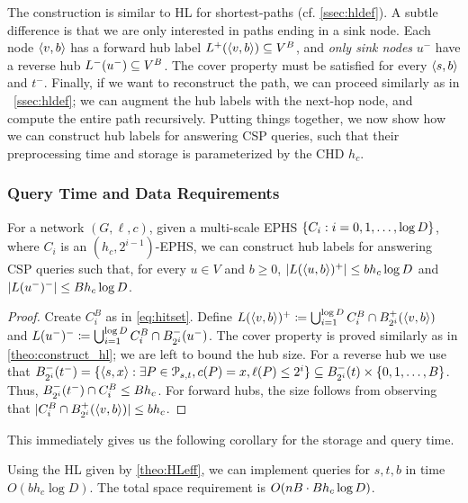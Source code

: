 The construction is similar to HL for shortest-paths (cf. \cref{ssec:hldef}).
A subtle difference is that we are only interested in paths ending in a sink node.
Each node $\pp{v,b}$ has a forward hub label $\Lf(\pp{v,b})\subseteq V^B$, and \emph{only sink nodes} $u^-$ have a reverse hub $\Lb(u^-)\subseteq V^B$.
The cover property must be satisfied for every $\pp{s,b}$ and $t^-$.
Finally, if we want to reconstruct the path, we can proceed similarly as in ~\cref{ssec:hldef}; we can augment the hub labels with the next-hop node, and compute the entire path recursively.
Putting things together, we now show how we can construct hub labels for answering CSP queries, such that their preprocessing time and storage is parameterized by the CHD $h_c$.

\subsubsection{Query Time and Data Requirements}

\begin{theorem}
\label{theo:HLeff}
For a network $(G,\ell,c)$, given a multi-scale EPHS $\crl*{C_i:i=0,1,\ldots,\log D}$, where $C_i$ is an $(h_c,2^{i-1})$-EPHS, we can construct hub labels for answering CSP queries such that, for every $u\in V$ and $b\geq 0$, $\card{L(\pp{u,b})^+}\leq bh_c\log D$ and $\card{L(u^-)^-}\leq Bh_c\log D$. 
\end{theorem}
\begin{proof}
Create $C_i^B$ as in \cref{eq:hitset}.
Define $L(\pp{v,b})^+ \defeq \bigcup_{i=1}^{\log D} C_i^B\cap \Bf_{2^i}(\pp{v,b})$ and $L(u^-)^-  \defeq \bigcup_{i=1}^{\log D} C_i^B\cap \Bb_{2^i}(u^-)$.
The cover property is proved similarly as in \cref{theo:construct_hl}; we are left to bound the hub size.
For a reverse hub we use that $\Bb_{2^i}(t^-) = \{\pp{s,x}: \exists P\in \Pst, c(P)=x, \ell(P)\leq 2^i\}
\subseteq \Bb_{2^i}(t)\times \{0,1,\ldots,B\}$.
Thus, $\Bb_{2^i}(t^-)\cap C_i^B\leq Bh_c$.
For forward hubs, the size follows from observing that $ \card{C_i^B\cap \Bf_{2^i}(\pp{v,b})}\leq bh_c$.
\end{proof}

This immediately gives us the following corollary for the storage and query time.
\begin{corollary}
Using the HL given by \cref{theo:HLeff}, we can implement queries for $s,t,b$ in time $O(b h_c\log D)$.
The total space requirement is $\Or(nB \cdot Bh_c\log D)$.
\end{corollary}